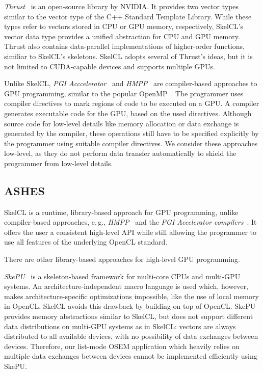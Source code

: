 \emph{Thrust}~\cite{BellHo2011} is an open-source library by NVIDIA.
It provides two vector types similar to the vector type of the C++ Standard Template Library.
While these types refer to vectors stored in CPU or GPU memory, respectively, SkelCL's vector data type provides a unified abstraction for CPU and GPU memory.
Thrust also contains data-parallel implementations of higher-order functions, similiar to SkelCL's skeletons.
SkelCL adopts several of Thrust's ideas, but it is not limited to CUDA-capable devices and supports multiple GPUs.

Unlike SkelCL, \emph{PGI Acccelerator}~\cite{PGI-10} and \emph{HMPP}~\cite{HMPP-09} are compiler-based approaches to GPU programming, similar to the popular OpenMP~\cite{OpenMP-08}.
The programmer uses compiler directives to mark regions of code to be executed on a GPU.
A compiler generates executable code for the GPU, based on the used directives.
Although source code for low-level details like memory allocation or data exchange is generated by the compiler, these operations still have to be specified explicitly by the programmer using suitable compiler directives.
We consider these approaches low-level, as they do not perform data transfer automatically to shield the programmer from low-level details.

\subsection{ASHES}
SkelCL is a runtime, library-based approach for GPU programming, unlike compiler-based approaches, e.\,g., \emph{HMPP}~\cite{HMPP-07} and the \emph{PGI Accelerator compilers}~\cite{PGI-10}.
It offers the user a consistent high-level API while still allowing the programmer to use all features of the underlying OpenCL standard.

There are other library-based approaches for high-level GPU programming.

\emph{SkePU}~\cite{EnmyrenKe10} is a skeleton-based framework for multi-core CPUs and multi-GPU systems.
An architecture-independent macro language is used which, however, makes architecture-specific optimizations impossible, like the use of local memory in OpenCL.
SkelCL avoids this drawback by building on top of OpenCL.
SkePU provides memory abstractions similar to SkelCL, but does not support different data distributions on multi-GPU systems as in SkelCL:
vectors are always distributed to all available devices, with no possibility of data exchanges between devices.
Therefore, our list-mode OSEM application which heavily relies on multiple data exchanges between devices cannot be implemented efficiently using SkePU.

